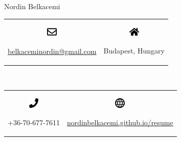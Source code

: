 \documentclass{article}
\begin{document}
\begin{center}
    {\Large{Nordin Belkacemi}} \\
    \vspace{5mm}
    \begin{tabular}{c c}
        \begin{minipage}[c]{5mm}
            \includegraphics[width=5mm]{../images/envelope-regular.pdf}
        \end{minipage}
        \begin{minipage}[c]{50mm}
            \href{mailto:belkaceminordin@gmail.com}{belkaceminordin@gmail.com}
        \end{minipage} &
        \begin{minipage}[c]{5mm}
            \includegraphics[width=5mm]{../images/home-solid.pdf}
        \end{minipage}
        \begin{minipage}[c]{50mm}
            Budapest, Hungary
        \end{minipage}
    \end{tabular} \\
    \vspace{2mm}
    \begin{tabular}{c c}
        \begin{minipage}[c]{5mm}
            \includegraphics[width=5mm]{../images/phone-solid.pdf}
        \end{minipage}
        \begin{minipage}[c]{50mm}
            +36-70-677-7611
        \end{minipage} &
        \vspace{2mm} 
        \begin{minipage}[c]{5mm}
            \includegraphics[width=5mm]{../images/world-wide-web.pdf}
        \end{minipage}
        \begin{minipage}[c]{50mm}
            \href{https://nordinbelkacemi.github.io/resume}{nordinbelkacemi.github.io/resume}
        \end{minipage}
    \end{tabular}
\end{center}
\end{document}
